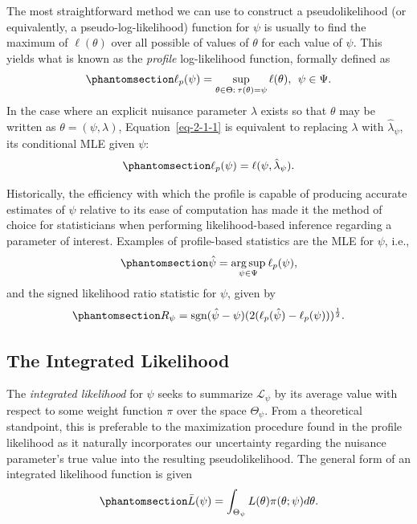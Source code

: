 \documentclass[
  12pt]{article}
\begin{document}
The most straightforward method we can use to construct a
pseudolikelihood (or equivalently, a pseudo-log-likelihood) function for
\(\psi\) is usually to find the maximum of \(\ell(\theta)\) over all
possible of values of \(\theta\) for each value of \(\psi\). This yields
what is known as the \emph{profile} log-likelihood function, formally
defined as \begin{equation}\phantomsection\label{eq-2-1-1}{
\ell_p(\psi) = \sup_{\theta \in \Theta: \> \tau(\theta) = \psi} \ell(\theta), \> \> \psi \in \Psi.
}\end{equation} In the case where an explicit nuisance parameter
\(\lambda\) exists so that \(\theta\) may be written as
\(\theta = (\psi, \lambda)\), Equation~\ref{eq-2-1-1} is equivalent to
replacing \(\lambda\) with \(\hat{\lambda}_{\psi}\), its conditional MLE
given \(\psi\): \begin{equation}\phantomsection\label{eq-2-1-2}{
\ell_p(\psi) = \ell(\psi, \hat{\lambda}_{\psi}).
}\end{equation}

Historically, the efficiency with which the profile is capable of
producing accurate estimates of \(\psi\) relative to its ease of
computation has made it the method of choice for statisticians when
performing likelihood-based inference regarding a parameter of interest.
Examples of profile-based statistics are the MLE for \(\psi\), i.e.,
\begin{equation}\phantomsection\label{eq-2-1-3}{
\hat{\psi} = \underset{\psi \in \Psi}{\arg\sup} \> \ell_p(\psi),
}\end{equation} and the signed likelihood ratio statistic for \(\psi\),
given by \begin{equation}\phantomsection\label{eq-2-1-4}{
R_{\psi} = \text{sgn}(\hat{\psi} - \psi)(2(\ell_p(\hat{\psi}) - \ell_p(\psi)))^{\frac{1}{2}}.
}\end{equation}

\subsection{The Integrated Likelihood}\label{the-integrated-likelihood}

The \emph{integrated likelihood} for \(\psi\) seeks to summarize
\(\mathcal{L}_{\psi}\) by its average value with respect to some weight
function \(\pi\) over the space \(\Theta_{\psi}\). From a theoretical
standpoint, this is preferable to the maximization procedure found in
the profile likelihood as it naturally incorporates our uncertainty
regarding the nuisance parameter's true value into the resulting
pseudolikelihood. The general form of an integrated likelihood function
is given \begin{equation}\phantomsection\label{eq-2-2-1}{
\bar{L}(\psi) = \int_{\Theta_{\psi}}L(\theta)\pi(\theta; \psi)d\theta.
}\end{equation}
\end{document}
